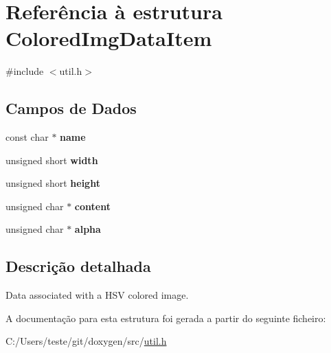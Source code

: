 \hypertarget{struct_colored_img_data_item}{\section{Referência à estrutura Colored\-Img\-Data\-Item}
\label{struct_colored_img_data_item}
}


{\ttfamily \#include $<$util.\-h$>$}

\subsection*{Campos de Dados}
\begin{DoxyCompactItemize}
\item 
\hypertarget{struct_colored_img_data_item_a8f8f80d37794cde9472343e4487ba3eb}{const char $\ast$ {\bfseries name}}\label{struct_colored_img_data_item_a8f8f80d37794cde9472343e4487ba3eb}

\item 
\hypertarget{struct_colored_img_data_item_a8a31e3e5c2765d45488c75c00bacfefd}{unsigned short {\bfseries width}}\label{struct_colored_img_data_item_a8a31e3e5c2765d45488c75c00bacfefd}

\item 
\hypertarget{struct_colored_img_data_item_aa8e4172ede7827e837ac528eae04c497}{unsigned short {\bfseries height}}\label{struct_colored_img_data_item_aa8e4172ede7827e837ac528eae04c497}

\item 
\hypertarget{struct_colored_img_data_item_a8cff7748b5b3118a34d99936238e78d8}{unsigned char $\ast$ {\bfseries content}}\label{struct_colored_img_data_item_a8cff7748b5b3118a34d99936238e78d8}

\item 
\hypertarget{struct_colored_img_data_item_abade0d805ae2234f757182754514c903}{unsigned char $\ast$ {\bfseries alpha}}\label{struct_colored_img_data_item_abade0d805ae2234f757182754514c903}

\end{DoxyCompactItemize}


\subsection{Descrição detalhada}
Data associated with a H\-S\-V colored image. 

A documentação para esta estrutura foi gerada a partir do seguinte ficheiro\-:\begin{DoxyCompactItemize}
\item 
C\-:/\-Users/teste/git/doxygen/src/\hyperlink{util_8h}{util.\-h}\end{DoxyCompactItemize}
